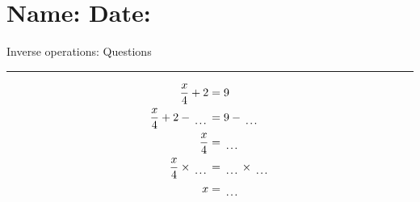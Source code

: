 \documentclass[12pt]{article}
\def \HeadingQuestions {\section*{\Large Name: \underline{\hspace{8cm}} \hfill Date: \underline{\hspace{3cm}}} \vspace{-3mm}
{Inverse operations: Questions} \vspace{1pt}\hrule}
\newcounter{minipagecount}
\begin{document}
\HeadingQuestions
\vspace{1mm}
\begin{multicols}{2}
\noindent{(\theminipagecount)}\hspace{0.1mm} %
\begin{minipage}[t]{0.45\textwidth} %
    \vspace{-26pt}  %
    \raggedright %
    \begin{align*} %
        \frac{x}{4} + 2 &= 9\\
        \frac{x}{4} + 2 - \dotuline{\hspace{5mm}} &= 9 - \dotuline{\hspace{5mm}}\\
        \frac{x}{4} &= \dotuline{\hspace{5mm}}\\
        \frac{x}{4} \times\dotuline{\hspace{5mm}} &= \dotuline{\hspace{5mm}} \times\dotuline{\hspace{5mm}}\\
        x &= \dotuline{\hspace{5mm}}\\
    \end{align*}
\end{minipage} %
\noindent{(\theminipagecount)}\hspace{0.1mm} %
\begin{minipage}[t]{0.45\textwidth} %
    \vspace{-26pt}  %

\end{minipage}
\end{multicols}
\end{document}
